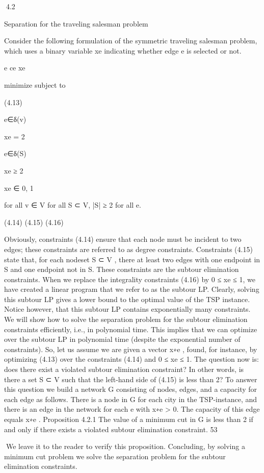 \documentclass[titlepage]{book}
\theoremstyle{plain}
\theoremstyle{definition}
\theoremstyle{remark}
\begin{document}
4.2

Separation for the traveling salesman problem

Consider the following formulation of the symmetric traveling salesman problem, which uses a binary
variable xe indicating whether edge e is selected or not.

e ce xe

minimize
subject to

(4.13)

e∈δ(v)

xe = 2

e∈δ(S)

xe ≥ 2

xe ∈ {0, 1}

for all v ∈ V
for all S ⊂ V, |S| ≥ 2
for all e.

(4.14)
(4.15)
(4.16)

Obviously, constraints (4.14) ensure that each node must be incident to two edges; these constraints are
referred to as degree constraints. Constraints (4.15) state that, for each nodeset S ⊂ V , there at least two
edges with one endpoint in S and one endpoint not in S. These constraints are the subtour elimination
constraints.
When we replace the integrality constraints (4.16) by 0 ≤ xe ≤ 1, we have created a linear program that
we refer to as the subtour LP. Clearly, solving this subtour LP gives a lower bound to the optimal value
of the TSP instance. Notice however, that this subtour LP contains exponentially many constraints. We
will show how to solve the separation problem for the subtour elimination constraints efficiently, i.e., in
polynomial time. This implies that we can optimize over the subtour LP in polynomial time (despite the
exponential number of constraints).
So, let us assume we are given a vector x∗e , found, for instance, by optimizing (4.13) over the constraints
(4.14) and 0 ≤ xe ≤ 1. The question now is: does there exist a violated subtour elimination constraint?
In other words, is there a set S ⊂ V such that the left-hand side of (4.15) is less than 2? To answer this
question we build a network G consisting of nodes, edges, and a capacity for each edge as follows. There
is a node in G for each city in the TSP-instance, and there is an edge in the network for each e with
x∗e > 0. The capacity of this edge equals x∗e .
Proposition 4.2.1 The value of a minimum cut in G is less than 2 if and only if there exists a violated
subtour elimination constraint.
53

We leave it to the reader to verify this proposition. Concluding, by solving a minimum cut problem we
solve the separation problem for the subtour elimination constraints.
\end{document}
